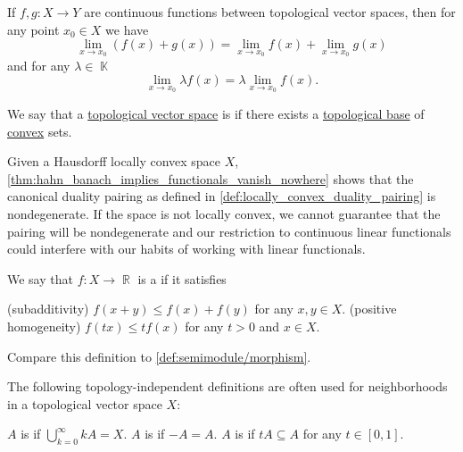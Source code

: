 \begin{corollary}\label{thm:linearity_of_function_limits}
  If \( f, g: X \to Y \) are continuous functions between topological vector spaces, then for any point \( x_0 \in X \) we have
  \begin{equation*}
    \lim_{x \to x_0} (f(x) + g(x)) = \lim_{x \to x_0} f(x) + \lim_{x \to x_0} g(x)
  \end{equation*}
  and for any \( \lambda \in \BbbK \)
  \begin{equation*}
    \lim_{x \to x_0} \lambda f(x) = \lambda \lim_{x \to x_0} f(x).
  \end{equation*}
\end{corollary}

\begin{definition}\label{def:locally_convex_space}
  We say that a \hyperref[def:topological_vector_space]{topological vector space} is  if there exists a \hyperref[def:topological_base]{topological base} of \hyperref[def:convex_hull]{convex} sets.
\end{definition}

\begin{remark}\label{def:locally_convex_duality_pairing}
  Given a Hausdorff locally convex space \( X \), \cref{thm:hahn_banach_implies_functionals_vanish_nowhere} shows that the canonical duality pairing as defined in \cref{def:locally_convex_duality_pairing} is nondegenerate. If the space is not locally convex, we cannot guarantee that the pairing will be nondegenerate and our restriction to continuous linear functionals could interfere with our habits of working with linear functionals.
\end{remark}

\begin{definition}\label{def:sublinear_functional}
  We say that \( f: X \to \BbbR \) is a  if it satisfies
  \begin{thmenum}
    (subadditivity) \( f(x + y) \leq f(x) + f(y) \) for any \( x, y \in X \).
    (positive homogeneity) \( f(tx) \leq t f(x) \) for any \( t > 0 \) and \( x \in X \).
  \end{thmenum}

  Compare this definition to \cref{def:semimodule/morphism}.
\end{definition}

\begin{definition}\label{def:neighborhood_set_types}
  The following topology-independent definitions are often used for neighborhoods in a topological vector space \( X \):

  \begin{thmenum}
     \( A \) is  if \( \bigcup_{k=0}^\infty kA = X \).
     \( A \) is  if \( -A = A \).
     \( A \) is  if \( tA \subseteq A \) for any \( t \in [0, 1] \).
  \end{thmenum}
\end{definition}
